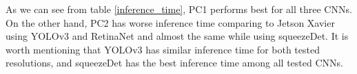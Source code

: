 \documentclass[twoside]{ctuthesis}
\theoremstyle{plain}
\theoremstyle{definition}
\theoremstyle{note}
\begin{document}
\begin{table}[htb]
        \centering
        \caption{PC1 technical specification}
        \label{malaria-tech-spec}
\end{table}
\begin{table}[htb]
        \centering
        \caption{PC2 technical specification}
        \label{my-tech-spec}
\end{table}

As we can see from table \ref{inference_time}, PC1 performs best for all three CNNs. On the other hand, PC2 has worse inference time comparing to Jetson Xavier using YOLOv3 and RetinaNet and almost the same while using squeezeDet. It is worth mentioning that YOLOv3 has similar inference time for both tested resolutions, and squeezeDet has the best inference time among all tested CNNs.
\end{document}
